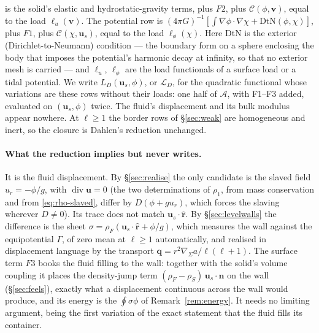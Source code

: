 \documentclass[11pt]{article}
\theoremstyle{definition}
\theoremstyle{remark}
\newcommand{\bu}{\mathbf{u}}
\newcommand{\bv}{\mathbf{v}}
\newcommand{\bn}{\mathbf{n}}
\newcommand{\bq}{\mathbf{q}}
\newcommand{\Div}{\operatorname{div}}
\newcommand{\gradS}{\nabla_\Sigma}
\newcommand{\Ltot}{\mathcal L}
\begin{document}
is the solid's elastic and hydrostatic-gravity terms, plus $F2$, plus
$\mathcal C(\phi, \bv)$, equal to the load $\ell_u(\bv)$. The potential
row is $(4\pi G)^{-1}[\int\nabla\phi\cdot\nabla\chi + \mathrm{DtN}(\phi,
\chi)]$, plus $F1$, plus $\mathcal C(\chi, \bu_s)$, equal to the load
$\ell_\phi(\chi)$. Here $\mathrm{DtN}$ is the exterior
(Dirichlet-to-Neumann) condition --- the boundary form on a sphere
enclosing the body that imposes the potential's harmonic decay at
infinity, so that no exterior mesh is carried --- and $\ell_u$,
$\ell_\phi$ are the load functionals of a surface load or a tidal
potential. We write $L_D(\bu_s, \phi)$, or $\Ltot_D$, for the quadratic
functional whose variations are these rows without their loads: one
half of $\mathcal A$, with F1--F3 added, evaluated on $(\bu_s, \phi)$
twice. The fluid's displacement and its bulk modulus appear nowhere. At
$\ell \ge 1$ the border rows of \S\ref{sec:weak} are homogeneous and
inert, so the closure is Dahlen's reduction unchanged.

\paragraph{What the reduction implies but never writes.} It is the
fluid displacement. By \S\ref{sec:realise} the only candidate is the
slaved field $u_r = -\phi/g$, with $\Div\bu = 0$ (the two
determinations of $\rho_1$, from mass conservation and from
\eqref{eq:rho-slaved}, differ by $D(\phi + g u_r)$, which forces the
slaving wherever $D \ne 0$). Its trace does not match
$\bu_s\cdot\hat{\mathbf r}$. By \S\ref{sec:levelwalls} the difference is
the sheet $\sigma = \rho_F(\bu_s\cdot\hat{\mathbf r} + \phi/g)$, which
measures the wall against the equipotential $\Gamma$, of zero mean at
$\ell \ge 1$ automatically, and realised in displacement language by
the transport $\bq = r^2\gradS a/\ell(\ell + 1)$. The surface term $F3$
books the fluid filling to the wall: together with the solid's volume
coupling it places the density-jump term $(\rho_F - \rho_S)\,
\bu_s\cdot\bn$ on the wall (\S\ref{sec:feels}), exactly what a
displacement continuous across the wall would produce, and its energy
is the $\oint\sigma\phi$ of Remark~\ref{rem:energy}. It needs no
limiting argument, being the first variation of the exact statement
that the fluid fills its container.
\end{document}
